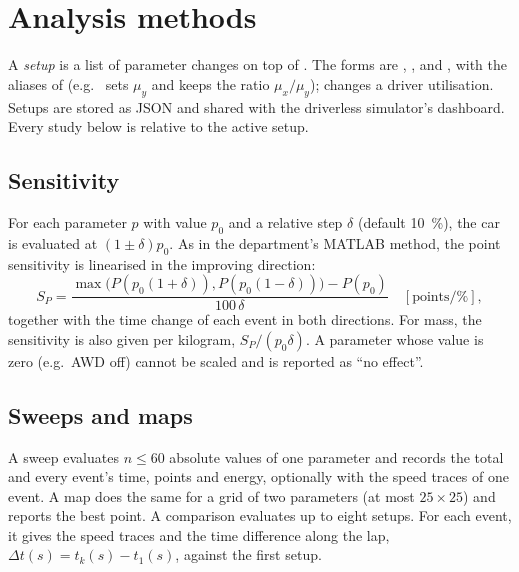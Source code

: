 \documentclass[11pt]{article}
\begin{document}
\section{Analysis methods}\label{sec:studies}
A \emph{setup} is a list of parameter changes on top of . The forms are
, ,  and , with the aliases of
 (e.g.\  sets $\mu_y$ and keeps the ratio $\mu_x/\mu_y$); 
changes a driver utilisation. Setups are stored as JSON and shared with the driverless simulator's dashboard.
Every study below is relative to the active setup.

\subsection{Sensitivity}
For each parameter $p$ with value $p_0$ and a relative step $\delta$ (default \SI{10}{\%}), the car is evaluated at
$(1\pm\delta)p_0$. As in the department's MATLAB method, the point sensitivity is linearised in the improving
direction:
\begin{equation}
S_P = \frac{\max\big(P(p_0(1+\delta)), P(p_0(1-\delta))\big) - P(p_0)}{100\,\delta}\quad[\text{points}/\%],
\end{equation}
together with the time change of each event in both directions. For mass, the sensitivity is also given per
kilogram, $S_P/(p_0\delta)$. A parameter whose value is zero (e.g.\ AWD off) cannot be scaled and is reported as
``no effect''.

\subsection{Sweeps and maps}
A sweep evaluates $n\le60$ absolute values of one parameter and records the total and every event's time, points
and energy, optionally with the speed traces of one event. A map does the same for a grid of two parameters (at
most $25\times25$) and reports the best point. A comparison evaluates up to eight setups. For each event, it gives
the speed traces and the time difference along the lap, $\Delta t(s) = t_k(s) - t_1(s)$, against the first setup.

\end{document}
